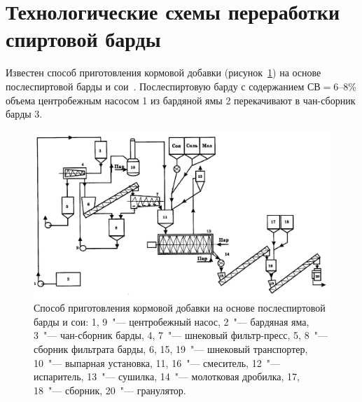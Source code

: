\section{Технологические схемы переработки спиртовой барды}

Известен способ приготовления кормовой добавки (рисунок~\ref{fig:stillage_bumbar}) на основе послеспиртовой барды и сои~\cite{Bumbar.Sposob.2003}.
Послеспиртовую барду с содержанием СВ\(=\)6--8\% объема центробежным насосом 1 из бардяной ямы 2 перекачивают в чан-сборник барды 3.
\begin{figure}[htb]
\centering
\includegraphics[width=\textwidth]{figures/temp/bumbar.jpg}
\caption[Способ приготовления кормовой добавки на основе послеспиртовой барды и сои]{Способ приготовления кормовой добавки на основе послеспиртовой барды и сои: 1, 9~"--- центробежный насос, 2~"--- бардяная яма, 3~"--- чан-сборник барды, 4, 7~"--- шнековый фильтр-пресс, 5, 8~"--- сборник фильтрата барды, 6, 15, 19~"--- шнековый транспортер, 10~"--- выпарная установка, 11, 16~"--- смеситель, 12~"--- испаритель, 13~"--- сушилка, 14~"--- молотковая дробилка, 17, 18~"--- сборник, 20~"--- гранулятор.}\label{fig:stillage_bumbar}
\end{figure}

